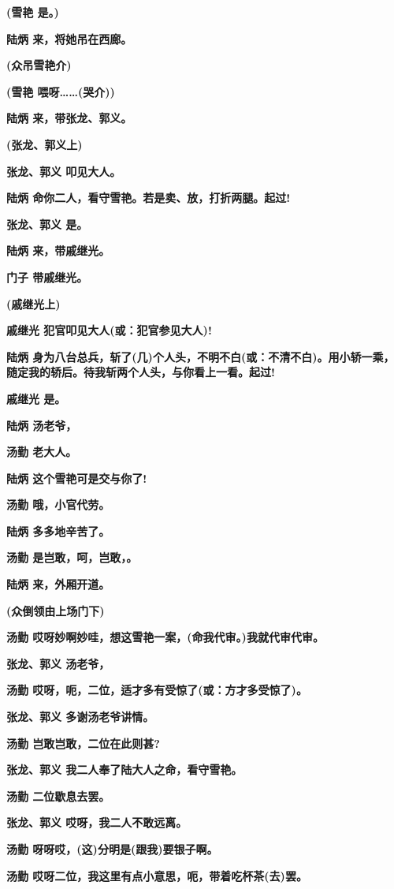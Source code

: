 \textbf{(雪艳 是。)}

\textbf{陆炳 来，将她吊在西廊。}

\textbf{(众吊雪艳介)}

\textbf{(雪艳 喂呀\ldots{}\ldots{}(哭介))}

\textbf{陆炳 来，带张龙、郭义。}

\textbf{(张龙、郭义上)}

\textbf{张龙、郭义 叩见大人。}

\textbf{陆炳 命你二人，看守雪艳。若是卖、放，打折两腿。起过!}

\textbf{张龙、郭义 是。}

\textbf{陆炳 来，带戚继光。}

\textbf{门子 带戚继光。}

\textbf{(戚继光上)}

\textbf{戚继光 犯官叩见大人(或：犯官参见大人)!}

\textbf{陆炳
身为八台总兵，斩了(几)个人头，不明不白(或：不清不白)。用小轿一乘，随定我的轿后。待我斩两个人头，与你看上一看。起过!}

\textbf{戚继光 是。}

\textbf{陆炳 汤老爷，}

\textbf{汤勤 老大人。}

\textbf{陆炳 这个雪艳可是交与你了!}

\textbf{汤勤 哦，小官代劳。}

\textbf{陆炳 多多地辛苦了。}

\textbf{汤勤 是岂敢，呵，岂敢，。}

\textbf{陆炳 来，外厢开道。}

\textbf{(众倒领由上场门下)}

\textbf{汤勤 哎呀妙啊妙哇，想这雪艳一案，(命我代审。)我就代审代审。}

\textbf{张龙、郭义 汤老爷，}

\textbf{汤勤 哎呀，呃，二位，适才多有受惊了(或：方才多受惊了)。}

\textbf{张龙、郭义 多谢汤老爷讲情。}

\textbf{汤勤 岂敢岂敢，二位在此则甚?}

\textbf{张龙、郭义 我二人奉了陆大人之命，看守雪艳。}

\textbf{汤勤 二位歇息去罢。}

\textbf{张龙、郭义 哎呀，我二人不敢远离。}

\textbf{汤勤 呀呀哎，(这)分明是(跟我)要银子啊。}

\textbf{汤勤 哎呀二位，我这里有点小意思，呃，带着吃杯茶(去)罢。}

